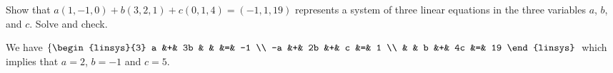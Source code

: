 

\begin{Exercise}[
name={},
title={}, 
difficulty=0,
origin={\cite{SM}}]
Show that $a(1,-1,0) + b(3,2,1) + c(0,1,4) = (-1,1,19)$ represents a system of three linear equations in the three variables $a$, $b$, and $c$. Solve and check.
\end{Exercise}

\begin{Answer}
We have $\left\{\begin{linsys}{3} a &+& 3b & & &=& -1 \\ -a &+& 2b &+& c &=& 1 \\  & & b &+& 4c &=& 19 \end{linsys}\right.$ which implies that $a=2$, $b=-1$ and $c=5$.
\end{Answer}
